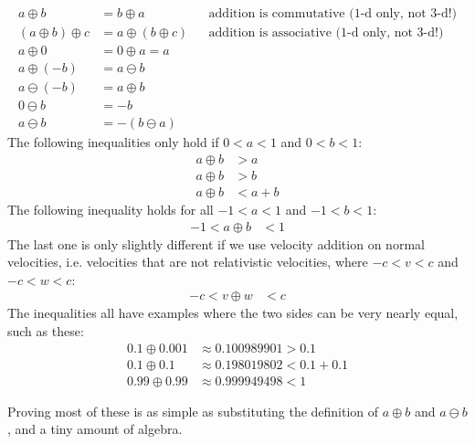 \documentclass[a4paper]{article}
\theoremstyle{plain}
\theoremstyle{definition}
\begin{document}
\begin{align}
a \oplus b & = b \oplus a & & \text{addition is commutative (1-d only, not 3-d!)} \label{defn:1dreladdcommutative} \\
(a \oplus b) \oplus c & = a \oplus (b \oplus c) & & \text{addition is associative (1-d only, not 3-d!)} \label{defn:1dreladdassociative} \\
a \oplus 0 & = 0 \oplus a = a \\
a \oplus (-b) & = a \ominus b \\
a \ominus (-b) & = a \oplus b \\
0 \ominus b & = -b \\
a \ominus b & = - (b \ominus a)
\end{align}
The following inequalities only hold if $0 < a < 1$ and $0 < b < 1$:
\begin{align}
a \oplus b & > a \label{inequal:reladdposlarger1} \\
a \oplus b & > b \label{inequal:reladdposlarger2} \\
a \oplus b & < a+b \label{inequal:reladdpossmallerthansum}
\end{align}
The following inequality holds for all $-1 < a < 1$ and $-1 < b < 1$:
\begin{align}
-1 < a \oplus b & < 1 \label{inequal:reladdpossmallerthanc}
\end{align}
The last one is only slightly different if we use velocity addition on
normal velocities, i.e. velocities that are not relativistic velocities,
where $-c < v < c$ and $-c < w < c$:
\begin{align}
-c < v \oplus w & < c \label{inequal:reladdpossmallerthanc2}
\end{align}
The inequalities all have examples where the two sides can be very
nearly equal, such as these:
\begin{align*}
0.1 \oplus 0.001 & \approx 0.100989901 > 0.1 \\
0.1 \oplus 0.1 & \approx 0.198019802 < 0.1+0.1 \\
0.99 \oplus 0.99 & \approx 0.999949498 < 1
\end{align*}

Proving most of these is as simple as substituting the definition of
$a \oplus b$ and $a \ominus b$, and a tiny amount of algebra.
\end{document}
